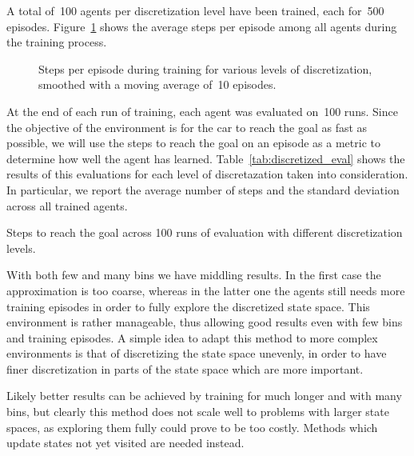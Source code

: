 A total of~100 agents per discretization level have been trained, each for~500 episodes. Figure~\ref{fig:discretized_steps} shows the average steps per episode among all agents during the training process.
\begin{figure}
\centering

\caption{Steps per episode during training for various levels of discretization, smoothed with a moving average of~10 episodes.}
\label{fig:discretized_steps}
\end{figure}
At the end of each run of training, each agent was evaluated on~100 runs. Since the objective of the environment is for the car to reach the goal as fast as possible, we will use the steps to reach the goal on an episode as a metric to determine how well the agent has learned. Table~\ref{tab:discretized_eval} shows the results of this evaluations for each level of discretazation taken into consideration. In particular, we report the average number of steps and the standard deviation across all trained agents.
\begin{table}
\centering
{}
\caption{Steps to reach the goal across 100 runs of evaluation with different discretization levels.}
\label{tab:discretized_eval}
\end{table}

With both few and many bins we have middling results. In the first case the approximation is too coarse, whereas in the latter one the agents still needs more training episodes in order to fully explore the discretized state space. This environment is rather manageable, thus allowing good results even with few  bins and training episodes. A simple idea to adapt this method to more complex environments is that of discretizing the state space unevenly, in order to have finer discretization in parts of the state space which are more important.

Likely better results can be achieved by training for much longer and with many bins, but clearly this method does not scale well to problems with larger state spaces, as exploring them fully could prove to be too costly. Methods which update states not yet visited are needed instead.

